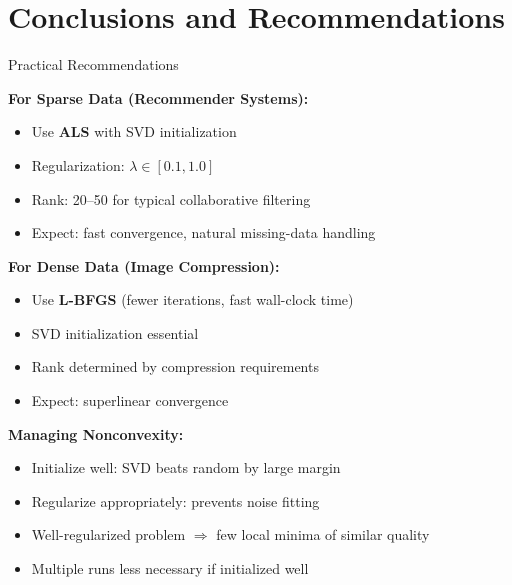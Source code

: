 \documentclass[aspectratio=169,usenames,dvipsnames]{beamer}
\begin{document}
\section{Conclusions and Recommendations}

\begin{frame}{Practical Recommendations}
    
    \textbf{For Sparse Data (Recommender Systems):}
    \begin{itemize}
        \item Use \textcolor{emoryblue}{\textbf{ALS}} with SVD initialization
        \item Regularization: $\lambda \in [0.1, 1.0]$
        \item Rank: 20--50 for typical collaborative filtering
        \item Expect: fast convergence, natural missing-data handling
    \end{itemize}
    
    \vspace{0.3cm}
    
    \textbf{For Dense Data (Image Compression):}
    \begin{itemize}
        \item Use \textcolor{emoryblue}{\textbf{L-BFGS}} (fewer iterations, fast wall-clock time)
        \item SVD initialization essential
        \item Rank determined by compression requirements
        \item Expect: superlinear convergence
    \end{itemize}
    
    \vspace{0.3cm}
    
    \textbf{Managing Nonconvexity:}
    \begin{itemize}
        \item Initialize well: SVD beats random by large margin
        \item Regularize appropriately: prevents noise fitting
        \item Well-regularized problem $\Rightarrow$ few local minima of similar quality
        \item Multiple runs less necessary if initialized well
    \end{itemize}
\end{frame}
\end{document}
